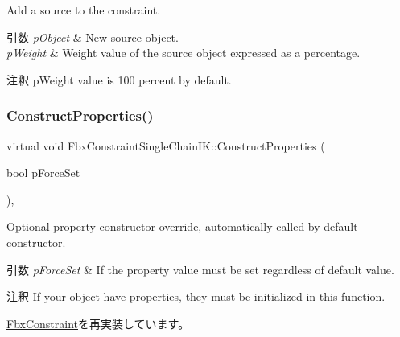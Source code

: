Add a source to the constraint. 
\begin{DoxyParams}{引数}
{\em p\+Object} & New source object. \\
\hline
{\em p\+Weight} & Weight value of the source object expressed as a percentage. \\
\hline
\end{DoxyParams}
\begin{DoxyRemark}{注釈}
p\+Weight value is 100 percent by default. 
\end{DoxyRemark}
\mbox{\label{class_fbx_constraint_single_chain_i_k_aeffab44c49ad72283bdb07e50e9baf77}} 
\subsubsection{\texorpdfstring{Construct\+Properties()}{ConstructProperties()}}
{\footnotesize\ttfamily virtual void Fbx\+Constraint\+Single\+Chain\+I\+K\+::\+Construct\+Properties (\begin{DoxyParamCaption}\item[{bool}]{p\+Force\+Set }\end{DoxyParamCaption})\hspace{0.3cm}{\ttfamily [protected]}, {\ttfamily [virtual]}}

Optional property constructor override, automatically called by default constructor. 
\begin{DoxyParams}{引数}
{\em p\+Force\+Set} & If the property value must be set regardless of default value. \\
\hline
\end{DoxyParams}
\begin{DoxyRemark}{注釈}
If your object have properties, they must be initialized in this function. 
\end{DoxyRemark}


\hyperlink{class_fbx_constraint_a0470a25b813b337d07a03ce4b97b44f8}{Fbx\+Constraint}を再実装しています。

\mbox{\label{class_fbx_constraint_single_chain_i_k_afeb5c6ab6342ec4aa81e69d3c9888bac}} 
